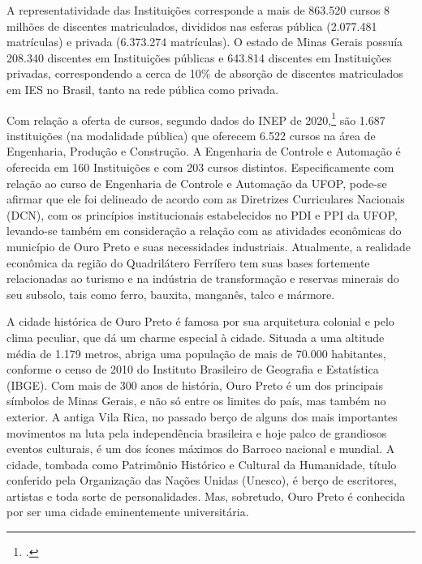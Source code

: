 \documentclass[
	12pt,				%
	openright,			%
	oneside,			%
	a4paper,			%
	english,			%
	brazil				%
	]{abntex2}
\begin{document}
A representatividade das Instituições corresponde a mais de 863.520 cursos
8 milhões de discentes matriculados, divididos nas esferas pública (2.077.481 matrículas) e privada (6.373.274 matrículas). O estado de Minas Gerais possuía 208.340 discentes em Instituições públicas e 643.814 discentes em Instituições privadas, correspondendo a cerca de 10\% de absorção de discentes matriculados em IES no Brasil, tanto na rede pública como privada.

Com relação a oferta de cursos, segundo dados do  INEP de 2020,\footcite[][]{senso-inep} são 1.687 instituições (na modalidade pública) que oferecem 6.522 cursos na área de Engenharia, Produção e Construção. A Engenharia de Controle e Automação é oferecida em 160 Instituições e com 203 cursos distintos. Especificamente com relação ao curso de Engenharia de Controle e Automação da UFOP, pode-se afirmar que ele foi delineado de acordo com as Diretrizes Curriculares Nacionais (DCN), com os princípios institucionais estabelecidos no PDI e PPI da UFOP, levando-se também em consideração a relação com as atividades econômicas do município de Ouro Preto e suas necessidades industriais. Atualmente, a realidade econômica da região do Quadrilátero Ferrífero tem suas bases fortemente relacionadas ao turismo e na indústria de transformação e reservas minerais do seu subsolo, tais como ferro, bauxita, manganês, talco e mármore.

A cidade histórica de Ouro Preto é famosa por sua arquitetura colonial e pelo clima peculiar, que dá um charme especial à cidade. Situada a uma altitude média de 1.179 metros, abriga uma população de mais de 70.000 habitantes, conforme o censo de 2010 do Instituto Brasileiro de Geografia e Estatística (IBGE). Com mais de 300 anos de história, Ouro Preto é um dos principais símbolos de Minas Gerais, e não só entre os limites do país, mas também no exterior. A antiga Vila Rica, no passado berço de alguns dos mais importantes movimentos na luta pela independência brasileira e hoje palco de grandiosos eventos culturais, é um dos ícones máximos do Barroco nacional e mundial. A cidade, tombada como Patrimônio Histórico e Cultural da Humanidade, título conferido pela Organização das Nações Unidas (Unesco), é berço de escritores, artistas e toda sorte de personalidades. Mas, sobretudo, Ouro Preto é conhecida por ser uma cidade eminentemente universitária.
\end{document}
